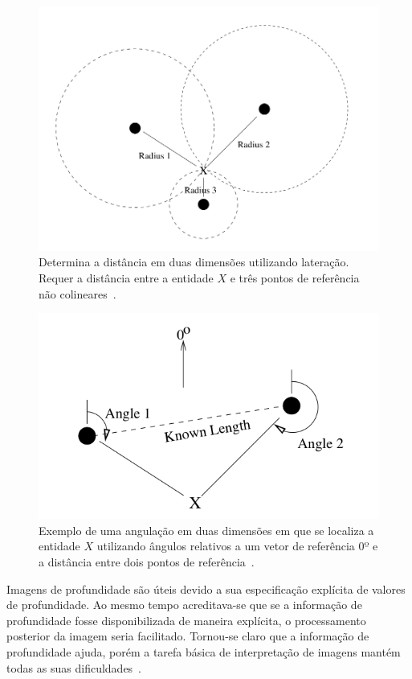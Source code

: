 	\begin{figure}[H]
		\begin{center}
			\includegraphics[scale=0.2]{figuras/2.FundamentacaoTeorica/lateration.png}
		\end{center}
		\caption{Determina a distância em duas dimensões utilizando lateração. Requer a distância entre a entidade $\displaystyle X$ e três pontos de referência não colineares~\cite{triangulacao}.}
		\label{lateration}
	\end{figure}

	\begin{figure}[H]
		\begin{center}
			\includegraphics[scale=0.4]{figuras/2.FundamentacaoTeorica/angulation.png}
		\end{center}
		\caption{Exemplo de uma angulação em duas dimensões em que se localiza a entidade $\displaystyle X$ utilizando ângulos relativos a um vetor de referência $\displaystyle 0º$ e a distância entre dois pontos de referência~\cite{triangulacao}.}
		\label{angulation}
	\end{figure}


	Imagens de profundidade são úteis devido a sua especificação explícita de valores de profundidade. Ao mesmo tempo acreditava-se que se a informação de profundidade fosse disponibilizada de maneira explícita, o processamento posterior da imagem seria facilitado. Tornou-se claro que a informação de profundidade ajuda, porém a tarefa básica de interpretação de imagens mantém todas as suas dificuldades~\cite{jain}.

